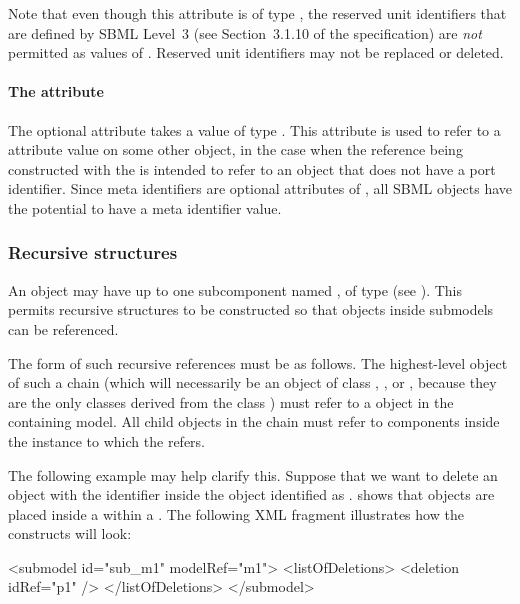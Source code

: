 Note that even though this attribute is of type ,
the reserved unit identifiers that are defined by SBML Level~3 (see
Section~3.1.10 of the \sbmlthreecore specification) are
\emph{not} permitted as values of .  Reserved unit
identifiers may not be replaced or deleted.


\paragraph{The \fixttspace{} attribute}
\label{sbaseref-metaidref}

The optional attribute  takes a value of type 
.  This attribute is used to refer to a 
attribute value on some other object, in the case when the reference
being constructed with the \SBaseRef is intended to refer to an object
that does not have a port identifier.  Since meta identifiers are
optional attributes of \SBase, all SBML objects have the potential to
have a meta identifier value.


\subsubsection{Recursive  structures}
\label{sbaseref-recursive-sbaseref}

An \SBaseRef object may have up to one subcomponent named
, of type \SBaseRef (see ).  This
permits recursive structures to be constructed so that
objects inside submodels can be referenced.

The form of such recursive references must be as follows.  The
highest-level \SBaseRef object of such a chain (which will necessarily
be an object of class \Port, \Deletion, \ReplacedElement or \ReplacedBy,
because they are the only classes derived from the class \SBaseRef) must
refer to a \Submodel object in the containing model.  All child
\SBaseRef objects in the chain must refer to components inside the
\Model instance to which the \Submodel refers.

The following example may help clarify this.  Suppose that we want to
delete an object with the identifier  inside the \Submodel
object identified as .   shows that \Deletion
objects are placed inside a \ListOfDeletions within a \Submodel.  The 
following XML fragment illustrates how the constructs will look:

\begin{example}
<submodel id="sub_m1" modelRef="m1">
  <listOfDeletions>
    <deletion idRef="p1" />
  </listOfDeletions>
</submodel>
\end{example}

